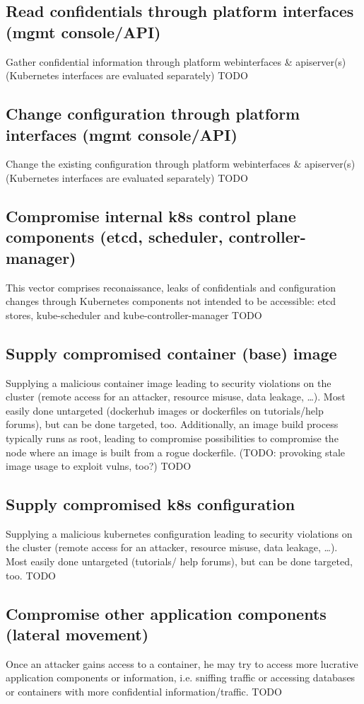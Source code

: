 \subsection{Read confidentials through platform interfaces (mgmt console/API)}
Gather confidential information through platform webinterfaces \& apiserver(s) (Kubernetes interfaces are evaluated separately)
TODO

\subsection{Change configuration through platform interfaces (mgmt console/API)}
Change the existing configuration through platform webinterfaces \& apiserver(s) (Kubernetes interfaces are evaluated separately)
TODO

\subsection{Compromise internal k8s control plane components (etcd, scheduler, controller-manager)}
This vector comprises reconaissance, leaks of confidentials and configuration changes through Kubernetes components not intended to be accessible: etcd stores, kube-scheduler and kube-controller-manager
TODO

\subsection{Supply compromised container (base) image}
Supplying a malicious container image leading to security violations on the cluster (remote access for an attacker, resource misuse, data leakage, …). Most easily done untargeted (dockerhub images or dockerfiles on tutorials/help forums), but can be done targeted, too. Additionally, an image build process typically runs as root, leading to compromise possibilities to compromise the node where an image is built from a rogue dockerfile. (TODO: provoking stale image usage to exploit vulns, too?)
TODO

\subsection{Supply compromised k8s configuration}
Supplying a malicious kubernetes configuration leading to security violations on the cluster (remote access for an attacker, resource misuse, data leakage, …). Most easily done untargeted (tutorials/ help forums), but can be done targeted, too.
TODO

\subsection{Compromise other application components (lateral movement)}
Once an attacker gains access to a container, he may try to access more lucrative application components or information, i.e. sniffing traffic or accessing databases or containers with more confidential information/traffic.
TODO

